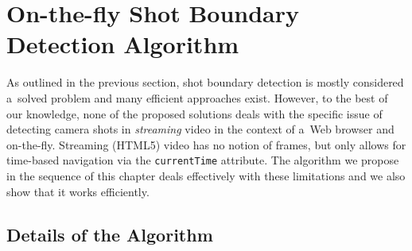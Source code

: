 \section{On-the-fly Shot Boundary Detection Algorithm}
\label{sec:details-of-algo}

As outlined in the previous section,
shot boundary detection is mostly considered a~solved problem
and many efficient approaches exist.
However, to the best of our knowledge,
none of the proposed solutions deals with
the specific issue of detecting camera shots in \emph{streaming} video
in the context of a~Web browser and on-the-fly.
Streaming (HTML5) video has no notion of frames,
but only allows for time-based navigation
via the \texttt{currentTime} attribute.
The algorithm we propose in the sequence of this chapter 
deals effectively with these limitations
and we also show that it works efficiently.

\subsection{Details of the Algorithm}

